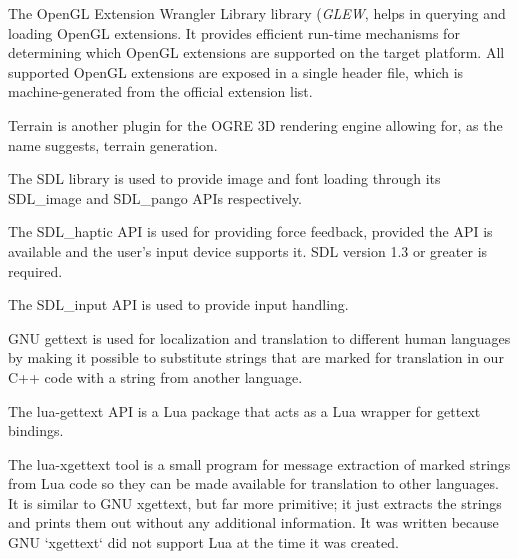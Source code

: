 
The OpenGL Extension Wrangler Library library ({\it GLEW}, helps in querying and loading OpenGL extensions. It provides efficient run-time mechanisms for determining which OpenGL extensions are supported on the target platform. All supported OpenGL extensions are exposed in a single header file, which is machine-generated from the official extension list.


Terrain is another plugin for the OGRE 3D rendering engine allowing for, as the name suggests, terrain generation.


The SDL library is used to provide image and font loading through its SDL_image and SDL_pango APIs respectively.
\stopitemize


\startitemize[3]
\setupwhitespace[big]

The SDL_haptic API is used for providing force feedback, provided the API is available and the user's input device supports it. SDL version 1.3 or greater is required.


The SDL_input API is used to provide input handling.
\stopitemize


\startitemize[3]
\setupwhitespace[big]

GNU gettext is used for localization and translation to different human languages by making it possible to substitute strings that are marked for translation in our C++ code with a string from another language.


The lua-gettext API is a Lua package that acts as a Lua wrapper for gettext bindings.


The lua-xgettext tool is a small program for message extraction of marked strings from Lua code so they can be made available for translation to other languages. It is similar to GNU xgettext, but far more primitive; it just extracts the strings and prints them out without any additional information. It was written because GNU `xgettext` did not support Lua at the time it was created.
\stopitemize

